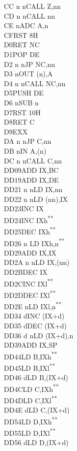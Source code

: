 \documentclass[twoside,openright,a4paper]{book}
\newcommand{\UNDOC}{\textnormal{\textsuperscript{**}}}
\begin{document}
\begin{multicols}{3}
{\begin{tabbing}
	CC n n\>CALL Z,nn\\
	CD n n\>CALL nn\\
	CE n\>ADC A,n\\
	CF\>RST 8H\\
	D0\>RET NC\\
	D1\>POP DE\\
	D2 n n\>JP NC,nn\\
	D3 n\>OUT (n),A\\
	D4 n n\>CALL NC,nn\\
	D5\>PUSH DE\\
	D6 n\>SUB n\\
	D7\>RST 10H\\
	D8\>RET C\\
	D9\>EXX\\
	DA n n\>JP C,nn\\
	DB n\>IN A,(n)\\
	DC n n\>CALL C,nn\\
	DD09\>ADD IX,BC\\
	DD19\>ADD IX,DE\\
	DD21 n n\>LD IX,nn\\
	DD22 n n\>LD (nn),IX\\
	DD23\>INC IX\\
	DD24\>INC IXh\UNDOC\\
	DD25\>DEC IXh\UNDOC\\
	DD26 n \>LD IXh,n\UNDOC\\
	DD29\>ADD IX,IX\\
	DD2A n n\>LD IX,(nn)\\
	DD2B\>DEC IX\\
	DD2C\>INC IXl\UNDOC\\
	DD2D\>DEC IXl\UNDOC\\
	DD2E n\>LD IXl,n\UNDOC\\
	DD34 d\>INC (IX+d)\\
	DD35 d\>DEC (IX+d)\\
	DD36 d n\>LD (IX+d),n\\
	DD39\>ADD IX,SP\\
	DD44\>LD B,IXh\UNDOC\\
	DD45\>LD B,IXl\UNDOC\\
	DD46 d\>LD B,(IX+d)\\
	DD4C\>LD C,IXh\UNDOC\\
	DD4D\>LD C,IXl\UNDOC\\
	DD4E d\>LD C,(IX+d)\\
	DD54\>LD D,IXh\UNDOC\\
	DD55\>LD D,IXl\UNDOC\\
	DD56 d\>LD D,(IX+d)\\

\end{tabbing}}
\end{multicols}
\end{document}
